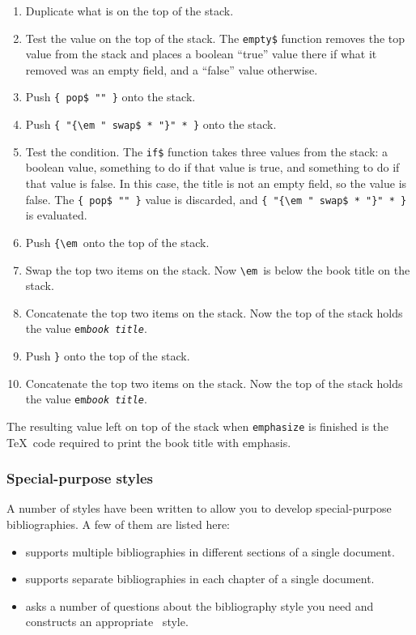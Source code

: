 \begin{enumerate}
  \item Duplicate what is on the top of the stack.
  \item Test the value on the top of the stack.  The \verb|empty$| function
        removes the top value from the stack and places a boolean ``true'' 
        value there if what it removed was an empty field, 
        and a ``false'' value otherwise.
  \item Push \verb|{ pop$ "" }| onto the stack.
  \item Push \verb|{ "{\em " swap$ * "}" * }| onto the stack.
  \item Test the condition.  The \verb|if$| function takes three values
        from the stack: a boolean value, something to do if that value
        is true, and something to do if that value is false.  In this
        case, the title is not an empty field, so the value is false.
        The \verb|{ pop$ "" }| value is discarded, and 
        \verb|{ "{\em " swap$ * "}" * }| is evaluated.
  \item Push \verb|{\em|\ttspace\ onto the top of the stack.
  \item Swap the top two items on the stack.  Now \verb|\em|\ttspace\ is
        below the book title on the stack.
  \item Concatenate the top two items on the stack.  Now the top of the
        stack holds the value \texttt{\bs em\ttspace\textit{book title}}.
  \item Push \verb|}| onto the top of the stack.
  \item Concatenate the top two items on the stack.  Now the top of the
        stack holds the value \texttt{\ttopenbrace\bs em\ttspace\textit{book
        title}\ttclosebrace}.
\end{enumerate}

The resulting value left on top of the stack when \verb|emphasize| 
is finished is the \TeX\ code required to print the book title with
emphasis.

\subsubsection{Special-purpose styles}

A number of styles have 
been written to allow you to develop special-purpose
bibliographies.  A few of them are listed here:

\begin{itemize}
  \item {} supports multiple bibliographies in 
          different sections of a single document.
  \item {} supports separate bibliographies 
          in each chapter of a single document.
  \item {} asks a number of 
          questions about the bibliography style you need and constructs an
          appropriate \BibTeX\ style.
\end{itemize}

